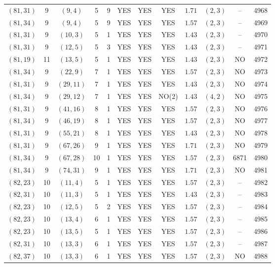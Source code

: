 \begin{longtable}{|c|c|c|c|c|c|c|c|c|c|c|c|}
$(81,31)$ & 9 & $(9,4)$ & 5 & 9 & YES & YES & YES & $1.71$ & $(2,3)$ & -- & 4968\\
$(81,34)$ & 9 & $(9,4)$ & 5 & 9 & YES & YES & YES & $1.57$ & $(2,3)$ & -- & 4969\\
$(81,31)$ & 9 & $(10,3)$ & 5 & 1 & YES & YES & YES & $1.43$ & $(2,3)$ & -- & 4970\\
$(81,31)$ & 9 & $(12,5)$ & 5 & 3 & YES & YES & YES & $1.43$ & $(2,3)$ & -- & 4971\\
$(81,19)$ & 11 & $(13,5)$ & 5 & 1 & YES & YES & YES & $1.43$ & $(2,3)$ & NO & 4972\\
$(81,34)$ & 9 & $(22,9)$ & 7 & 1 & YES & YES & YES & $1.57$ & $(2,3)$ & NO & 4973\\
$(81,31)$ & 9 & $(29,11)$ & 7 & 1 & YES & YES & YES & $1.43$ & $(2,3)$ & NO & 4974\\
$(81,34)$ & 9 & $(29,12)$ & 7 & 1 & YES & YES & NO(2) & $1.43$ & $(4,2)$ & NO & 4975\\
$(81,31)$ & 9 & $(41,16)$ & 8 & 1 & YES & YES & YES & $1.57$ & $(2,3)$ & NO & 4976\\
$(81,34)$ & 9 & $(46,19)$ & 8 & 1 & YES & YES & YES & $1.57$ & $(2,3)$ & NO & 4977\\
$(81,31)$ & 9 & $(55,21)$ & 8 & 1 & YES & YES & YES & $1.43$ & $(2,3)$ & NO & 4978\\
$(81,31)$ & 9 & $(67,26)$ & 9 & 1 & YES & YES & YES & $1.71$ & $(2,3)$ & NO & 4979\\
$(81,34)$ & 9 & $(67,28)$ & 10 & 1 & YES & YES & YES & $1.57$ & $(2,3)$ & 6871 & 4980\\
$(81,34)$ & 9 & $(74,31)$ & 9 & 1 & YES & YES & YES & $1.71$ & $(2,3)$ & NO & 4981\\
$(82,23)$ & 10 & $(11,4)$ & 5 & 1 & YES & YES & YES & $1.57$ & $(2,3)$ & -- & 4982\\
$(82,31)$ & 10 & $(11,3)$ & 5 & 1 & YES & YES & YES & $1.43$ & $(2,3)$ & -- & 4983\\
$(82,23)$ & 10 & $(12,5)$ & 5 & 2 & YES & YES & YES & $1.57$ & $(2,3)$ & -- & 4984\\
$(82,23)$ & 10 & $(13,4)$ & 6 & 1 & YES & YES & YES & $1.57$ & $(2,3)$ & -- & 4985\\
$(82,23)$ & 10 & $(13,5)$ & 5 & 1 & YES & YES & YES & $1.57$ & $(2,3)$ & -- & 4986\\
$(82,31)$ & 10 & $(13,3)$ & 6 & 1 & YES & YES & YES & $1.57$ & $(2,3)$ & -- & 4987\\
$(82,37)$ & 10 & $(13,3)$ & 6 & 1 & YES & YES & YES & $1.57$ & $(2,3)$ & NO & 4988\\

\end{longtable}
